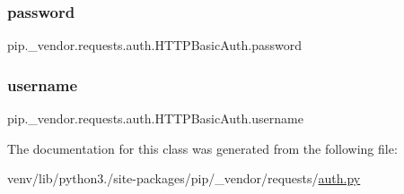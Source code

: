 \subsubsection{\texorpdfstring{password}{password}}
{\footnotesize\ttfamily pip.\+\_\+vendor.\+requests.\+auth.\+H\+T\+T\+P\+Basic\+Auth.\+password}

\mbox{\label{classpip_1_1__vendor_1_1requests_1_1auth_1_1HTTPBasicAuth_a1952a1fdb4f4bb246d028a2bde2b867a}} 
\subsubsection{\texorpdfstring{username}{username}}
{\footnotesize\ttfamily pip.\+\_\+vendor.\+requests.\+auth.\+H\+T\+T\+P\+Basic\+Auth.\+username}



The documentation for this class was generated from the following file\+:\begin{DoxyCompactItemize}
\item 
venv/lib/python3./site-\/packages/pip/\+\_\+vendor/requests/\hyperlink{__vendor_2requests_2auth_8py}{auth.\+py}\end{DoxyCompactItemize}
